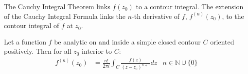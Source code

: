 \documentclass[12pt, english]{book}
\begin{document}
	
	The Cauchy Integral Theorem links \(f(z_0)\) to a contour integral. The extension of the Cauchy Integral Formula links the \(n\)-th derivative of \(f\), \(f^{(n)}(z_0)\), to the contour integral of \(f\) at \(z_0\).
	\begin{theorem}
		\label{Cauchy Integral Formula (Extension) - Complex}
		Let a function \(f\) be analytic on and inside a simple closed contour \(C\) oriented positively. Then for all \(z_0\) interior to \(C\):
		\begin{align*}
			f^{(n)}(z_0) &= \frac{n!}{2\pi i} \int_{C} \frac{f(z)}{(z-z_0)^{n+1}} dz & n \in \mathbb{N} \cup \{0\}
		\end{align*}
	\end{theorem}
\end{document}
